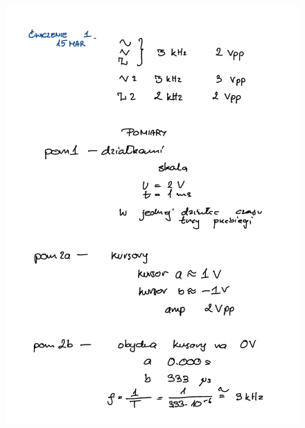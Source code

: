 \documentclass[14pt, table]{extarticle}
\begin{document}
\begin{figure}[H]
\includegraphics[scale=0.23]{B0}
\centering
\end{figure}
\end{document}
